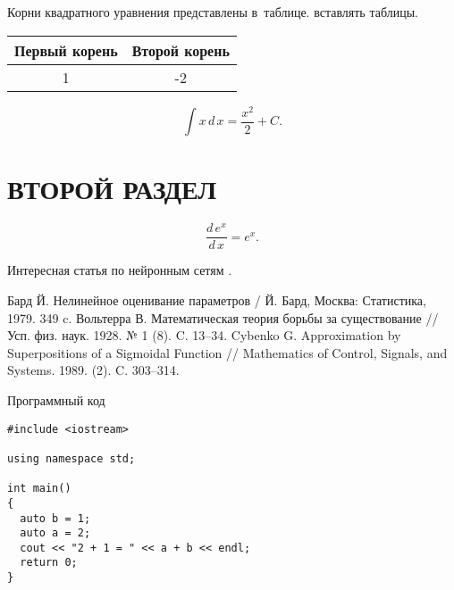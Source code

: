 \documentclass{bacgost}
\begin{document}
Корни квадратного уравнения представлены в~таблице. вставлять таблицы.
\begin{gosttable}
\begin{center} 
\begin{tabular}{|c|c|}
\hline 
Первый корень &  Второй корень \\ 
\hline 
1 & -2  \\ 
\hline 
\end{tabular} 
\end{center}
\end{gosttable}

\[
\int x\,d\,x = \dfrac{x^2}{2} + C.
\]

\section{ВТОРОЙ РАЗДЕЛ}
\[
\dfrac{d\,e^x}{d\,x} = e^x.
\]

Интересная статья по нейронным сетям \cite{Cybenko}.


\begin{gostbibliography}{11}
 Бард Й. Нелинейное оценивание параметров / Й. Бард, Москва: Статистика, 1979. 349 c.
 Вольтерра В. Математическая теория борьбы за существование // Усп. физ. наук. 1928. № 1 (8). C. 13–34.
 Cybenko G. Approximation by Superpositions of a Sigmoidal Function // Mathematics of Control, Signals, and Systems. 1989. (2). C. 303–314.
\end{gostbibliography}

\appendixes

\begin{gostappendix}{Программный код}
\lstset{language=[11]c++,basicstyle=\ttfamily, showstringspaces=false}

\begin{lstlisting}
#include <iostream>

using namespace std;

int main()
{
  auto b = 1;
  auto a = 2;
  cout << "2 + 1 = " << a + b << endl;
  return 0;
}
\end{lstlisting}
\end{gostappendix}
\end{document}
